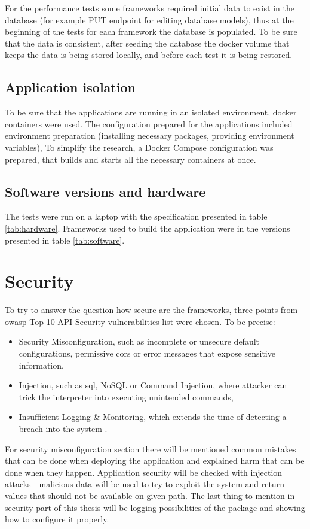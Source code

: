 For the performance tests some frameworks required initial data to exist in the database (for example PUT endpoint for editing database models), thus at the beginning of the tests for each framework the database is populated. To be sure that the data is consistent, after seeding the database the docker volume that keeps the data is being stored locally, and before each test it is being restored.

\subsection{Application isolation}

To be sure that the applications are running in an isolated environment, docker containers were used. The configuration prepared for the applications included environment preparation (installing necessary packages, providing environment variables), To simplify the research, a Docker Compose configuration was prepared, that builds and starts all the necessary containers at once.

\subsection{Software versions and hardware}

The tests were run on a laptop with the specification presented in table \ref{tab:hardware}.
Frameworks used to build the application were in the versions presented in table \ref{tab:software}.





\section{Security}
To try to answer the question how secure are the frameworks, three points from \acrshort{owasp} Top 10 API Security vulnerabilities list were chosen. To be precise:
\begin{itemize}
  \item Security Misconfiguration, such as incomplete or unsecure default configurations, permissive \acrshort{cors} or error messages that expose sensitive information,
  \item Injection, such as \acrshort{sql}, NoSQL or Command Injection, where attacker can trick the interpreter into executing unintended commands,
  \item Insufficient Logging \& Monitoring, which extends the time of detecting a breach into the system \cite{owaspTop10}.
\end{itemize}
For security misconfiguration section there will be mentioned common mistakes that can be done when deploying the application and explained harm that can be done when they happen.
Application security will be checked with injection attacks - malicious data will be used to try to exploit the system and return values that should not be available on given path.
The last thing to mention in security part of this thesis will be logging possibilities of the package and showing how to configure it properly.
